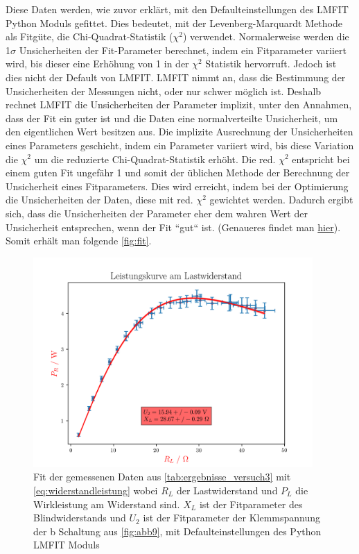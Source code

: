 \documentclass[11pt,ngerman]{scrartcl}
\begin{document}
Diese Daten werden, wie zuvor erklärt, mit den Defaulteinstellungen des LMFIT
Python Moduls \cite{LmFitNewville2014} gefittet. Dies bedeutet, mit der Levenberg-Marquardt Methode als
Fitgüte, die Chi-Quadrat-Statistik ($\chi^2$) verwendet.
Normalerweise werden die 1$\sigma$ Unsicherheiten der Fit-Parameter berechnet,
indem ein Fitparameter variiert wird, bis dieser eine Erhöhung von 1 in der
$\chi^2$ Statistik hervorruft. Jedoch ist dies nicht der Default von LMFIT.
LMFIT nimmt an, dass die Bestimmung der Unsicherheiten der Messungen nicht, oder
nur schwer möglich ist. Deshalb rechnet LMFIT die Unsicherheiten der Parameter
implizit, unter den Annahmen, dass der Fit ein guter ist und die Daten eine
normalverteilte Unsicherheit, um den eigentlichen Wert besitzen aus. Die implizite
Ausrechnung der Unsicherheiten eines Parameters geschieht, indem ein Parameter
variiert wird, bis diese Variation die $\chi^2$ um die reduzierte
Chi-Quadrat-Statistik erhöht. Die red. $\chi^2$ entspricht bei einem guten Fit
ungefähr 1 und somit der üblichen Methode der Berechnung der
Unsicherheit eines Fitparameters. Dies wird erreicht, indem bei der Optimierung
die Unsicherheiten der Daten, diese mit red. $\chi^2$ gewichtet werden. Dadurch ergibt
sich, dass die Unsicherheiten der Parameter eher dem wahren Wert der
Unsicherheit entsprechen, wenn der Fit ``gut`` ist. (Genaueres findet man
\href{https://lmfit.github.io/lmfit-py/fitting.html#uncertainties-in-variable-parameters-and-their-correlations}{hier}).
\vspace{2mm}
Somit erhält man folgende \autoref{fig:fit}.

\begin{figure}[H]
	\begin{center}
		\includegraphics[width=0.95\textwidth]{./bigpics/original.png}
	\end{center}
	\caption{Fit der gemessenen Daten aus \autoref{tab:ergebnisse_versuch3} mit
		\autoref{eq:widerstandleistung} wobei $R_L$ der Lastwiderstand und $P_L$ die
		Wirkleistung am Widerstand sind. $X_L$ ist der Fitparameter des
		Blindwiderstands und $U_2$ ist der Fitparameter der Klemmspannung der b Schaltung aus
		\autoref{fig:abb9}, mit Defaulteinstellungen des Python LMFIT Moduls}
	\label{fig:fit}
\end{figure}
\end{document}
